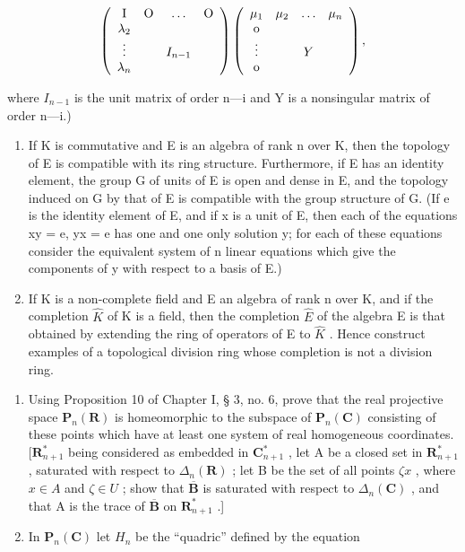 \[
\left( \begin{array}{c c c c} \mathrm{I} & \mathrm{O} & \ldots & \mathrm{O} \\ \lambda_ {2} & & & \\ \vdots & & I _ {n - 1} & \\ \lambda_ {n} & & & \end{array} \right) \left( \begin{array}{c c c c} \mu_ {1} & \mu_ {2} & \ldots & \mu_ {n} \\ \mathrm{o} & & & \\ \vdots & & Y & \\ \mathrm{o} & & & \end{array} \right),
\]

where \(I_{n-1}\) is the unit matrix of order n---i and Y is a nonsingular matrix of order n---i.)

\begin{enumerate}
\def\labelenumi{\alph{enumi})}
\setcounter{enumi}{2}
\item
  If K is commutative and E is an algebra of rank n over K, then the topology of E is compatible with its ring structure. Furthermore, if E has an identity element, the group G of units of E is open and dense in E, and the topology induced on G by that of E is compatible with the group structure of G. (If e is the identity element of E, and if x is a unit of E, then each of the equations xy = e, yx = e has one and one only solution y; for each of these equations consider the equivalent system of n linear equations which give the components of y with respect to a basis of E.)
\item
  If K is a non-complete field and E an algebra of rank n over K, and if the completion \(\hat{K}\) of K is a field, then the completion \(\hat{E}\) of the algebra E is that obtained by extending the ring of operators of E to \(\hat{K}\) . Hence construct examples of a topological division ring whose completion is not a division ring.
\end{enumerate}

\begin{enumerate}
\def\labelenumi{\arabic{enumi})}
\setcounter{enumi}{2}
\item
  Using Proposition 10 of Chapter I, § 3, no. 6, prove that the real projective space \(\mathbf{P}_{n}(\mathbf{R})\) is homeomorphic to the subspace of \(\mathbf{P}_{n}(\mathbf{C})\) consisting of these points which have at least one system of real homogeneous coordinates. \([\mathbf{R}_{n+1}^{*}\) being considered as embedded in \(\mathbf{C}_{n+1}^{*}\) , let A be a closed set in \(\mathbf{R}_{n+1}^{*}\) , saturated with respect to \(\Delta_{n}(\mathbf{R})\) ; let B be the set of all points \(\zeta x\) , where \(x \in A\) and \(\zeta \in U\) ; show that \(\overline{\mathbf{B}}\) is saturated with respect to \(\Delta_{n}(\mathbf{C})\) , and that A is the trace of \(\overline{\mathbf{B}}\) on \(\mathbf{R}_{n+1}^{*}\) .{]}
\item
  In \(\mathbf{P}_{n}(\mathbf{C})\) let \(H_{n}\) be the ``quadric'' defined by the equation
\end{enumerate}

